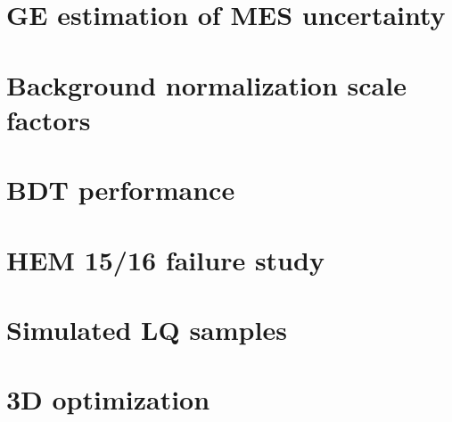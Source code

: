 \documentclass[thesis]{neu}
\begin{document}
%


    
\clearpage
\appendix

\chapter{GE estimation of MES uncertainty} \label{app:GEScaleSyst}


\clearpage
\chapter{Background normalization scale factors} \label{app:SFStudy}


\clearpage
\chapter{BDT performance} \label{app:BDTPerformance}


\clearpage
\chapter{HEM 15/16 failure study} \label{app:HEMFailure}


\clearpage
\chapter{Simulated LQ samples} \label{app:SimLQSamples}


\clearpage
\chapter{3D optimization} \label{app:3DOptimization}

\end{document}
